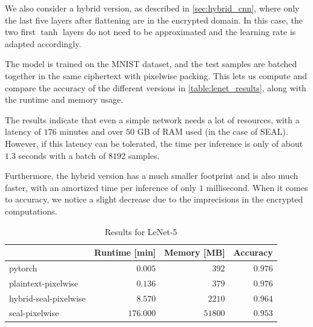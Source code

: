 \documentclass[a4paper,11pt,oneside]{report}
\begin{document}
We also consider a hybrid version, as described in \autoref{sec:hybrid_cnn}, where only the last five layers after flattening are in the encrypted domain. In this case, the two first $\tanh$ layers do not need to be approximated and the learning rate is adapted accordingly.

The model is trained on the MNIST dataset, and the test samples are batched together in the same ciphertext with pixelwise packing. This lets us compute and compare the accuracy of the different versions in \autoref{table:lenet_results}, along with the runtime and memory usage.

The results indicate that even a simple network needs a lot of resources, with a latency of $176$ minutes and over $50$ GB of RAM used (in the case of SEAL).
However, if this latency can be tolerated, the time per inference is only of about $1.3$ seconds with a batch of $8192$ samples.

Furthermore, the hybrid version has a much smaller footprint and is also much faster, with an amortized time per inference of only $1$ millisecond. When it comes to accuracy, we notice a slight decrease due to the imprecisions in the encrypted computations.


\begin{table}[h!]
  \begin{center}
    \caption{Results for LeNet-5}
    \label{table:lenet_results}
    \vspace*{2mm}
    \begin{tabular}{ l r r r }
    \hline
    &  Runtime [min] &  Memory [MB] &  Accuracy \\
    \hline
    pytorch & $0.005$ & $392$ & $0.976$ \\
    plaintext-pixelwise & $0.136$ & $379$ & $0.976$ \\
    hybrid-seal-pixelwise & $8.570$ & $2210$ & $0.964$ \\
    seal-pixelwise & $176.000$ & $51800$ & $0.953$ \\
    \hline
    \end{tabular}
  \end{center}
\end{table}
\end{document}
